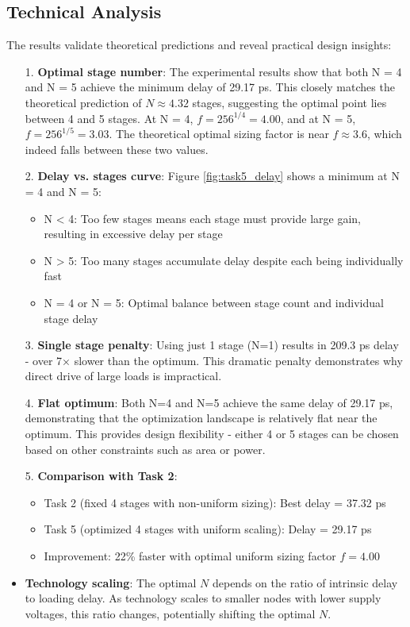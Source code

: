 \documentclass[UTF8,12pt,a4paper]{ctexart}
\begin{document}
\subsection{Technical Analysis}

The results validate theoretical predictions and reveal practical design insights:

\begin{itemize}
    \item[1. ] \textbf{Optimal stage number}: The experimental results show that both N = 4 and N = 5 achieve the minimum delay of 29.17 ps. This closely matches the theoretical prediction of $N \approx 4.32$ stages, suggesting the optimal point lies between 4 and 5 stages. At N = 4, $f = 256^{1/4} = 4.00$, and at N = 5, $f = 256^{1/5} = 3.03$. The theoretical optimal sizing factor is near $f \approx 3.6$, which indeed falls between these two values.

    \item[2. ] \textbf{Delay vs. stages curve}: Figure \ref{fig:task5_delay} shows a minimum at N = 4 and N = 5:
    \begin{itemize}
        \item N < 4: Too few stages means each stage must provide large gain, resulting in excessive delay per stage
        \item N > 5: Too many stages accumulate delay despite each being individually fast
        \item N = 4 or N = 5: Optimal balance between stage count and individual stage delay
    \end{itemize}
    
    \item[3. ] \textbf{Single stage penalty}: Using just 1 stage (N=1) results in 209.3 ps delay - over 7× slower than the optimum. This dramatic penalty demonstrates why direct drive of large loads is impractical.
    
    \item[4. ] \textbf{Flat optimum}: Both N=4 and N=5 achieve the same delay of 29.17 ps, demonstrating that the optimization landscape is relatively flat near the optimum. This provides design flexibility - either 4 or 5 stages can be chosen based on other constraints such as area or power.
    
    \item[5. ] \textbf{Comparison with Task 2}: 
    \begin{itemize}
        \item Task 2 (fixed 4 stages with non-uniform sizing): Best delay = 37.32 ps
        \item Task 5 (optimized 4 stages with uniform scaling): Delay = 29.17 ps
        \item Improvement: 22\% faster with optimal uniform sizing factor $f = 4.00$
    \end{itemize}


    \item \textbf{Technology scaling}: The optimal $N$ depends on the ratio of intrinsic delay to loading delay. As technology scales to smaller nodes with lower supply voltages, this ratio changes, potentially shifting the optimal $N$.
\end{itemize}
\end{document}
